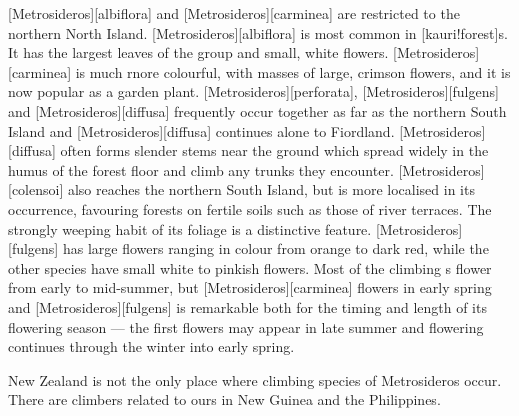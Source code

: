 [Metrosideros][albiflora] and [Metrosideros][carminea] are restricted to the northern North Island. [Metrosideros][albiflora] is most common in [kauri!forest]s.
It has the largest leaves of the group and small, white flowers. [Metrosideros][carminea] is much rnore colourful, with masses of large, crimson flowers, and it is now popular as a garden plant. [Metrosideros][perforata], [Metrosideros][fulgens] and [Metrosideros][diffusa] frequently occur together as far as the northern South Island and [Metrosideros][diffusa] continues alone to Fiordland. [Metrosideros][diffusa] often forms slender stems near the ground which spread widely in the humus of the forest floor and climb any trunks they encounter. [Metrosideros][colensoi] also reaches the northern South Island, but is more localised in its occurrence, favouring forests on fertile soils such as those of river terraces.
The strongly weeping habit of its foliage is a distinctive feature. [Metrosideros][fulgens] has large flowers ranging in colour from orange to dark red, while the other species have small white to pinkish flowers.
Most of the climbing s flower from early to mid-summer, but [Metrosideros][carminea] flowers in early spring and [Metrosideros][fulgens] is remarkable both for the timing and length of its flowering season --- the first flowers may appear in late summer and flowering continues through the winter into early spring.

New Zealand is not the only place where climbing species of Metrosideros occur.
There are climbers related to ours in New Guinea and the Philippines.

